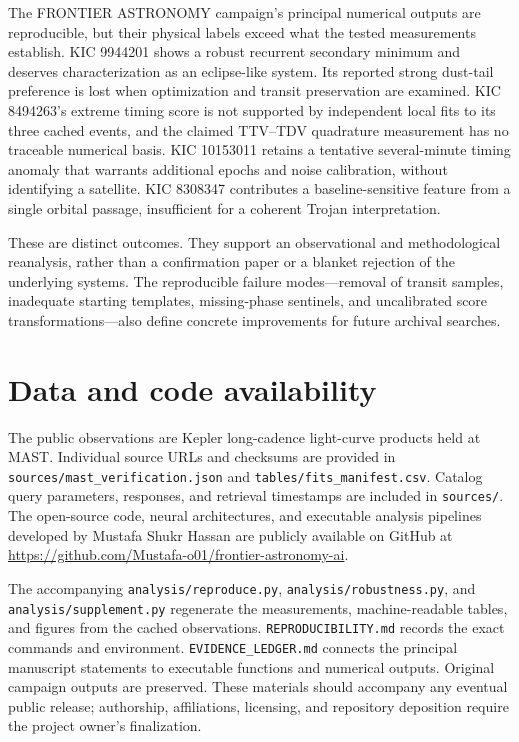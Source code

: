 \documentclass[
  english,
]{article}
\begin{document}
The FRONTIER ASTRONOMY campaign's principal numerical outputs are
reproducible, but their physical labels exceed what the tested
measurements establish. KIC 9944201 shows a robust recurrent secondary
minimum and deserves characterization as an eclipse-like system. Its
reported strong dust-tail preference is lost when optimization and
transit preservation are examined. KIC 8494263's extreme timing score is
not supported by independent local fits to its three cached events, and
the claimed TTV--TDV quadrature measurement has no traceable numerical
basis. KIC 10153011 retains a tentative several-minute timing anomaly
that warrants additional epochs and noise calibration, without
identifying a satellite. KIC 8308347 contributes a baseline-sensitive
feature from a single orbital passage, insufficient for a coherent
Trojan interpretation.

These are distinct outcomes. They support an observational and
methodological reanalysis, rather than a confirmation paper or a blanket
rejection of the underlying systems. The reproducible failure
modes---removal of transit samples, inadequate starting templates,
missing-phase sentinels, and uncalibrated score transformations---also
define concrete improvements for future archival searches.

\section{Data and code availability}\label{data-and-code-availability}

The public observations are Kepler long-cadence light-curve products
held at MAST. Individual source URLs and checksums are provided in
\texttt{sources/mast\_verification.json} and
\texttt{tables/fits\_manifest.csv}. Catalog query parameters, responses,
and retrieval timestamps are included in \texttt{sources/}. The open-source code, neural architectures, and executable analysis pipelines
developed by Mustafa Shukr Hassan are publicly available on GitHub at
\url{https://github.com/Mustafa-o01/frontier-astronomy-ai}.

The accompanying \texttt{analysis/reproduce.py},
\texttt{analysis/robustness.py}, and \texttt{analysis/supplement.py}
regenerate the measurements, machine-readable tables, and figures from
the cached observations. \texttt{REPRODUCIBILITY.md} records the exact
commands and environment. \texttt{EVIDENCE\_LEDGER.md} connects the
principal manuscript statements to executable functions and numerical
outputs. Original campaign outputs are preserved. These materials should
accompany any eventual public release; authorship, affiliations,
licensing, and repository deposition require the project owner's
finalization.
\end{document}
